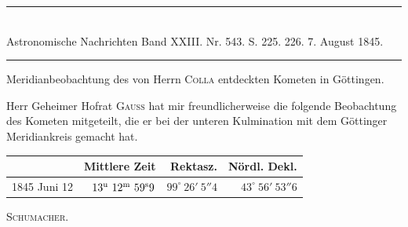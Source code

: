 \clearpage
{}
\hypertarget{native-476-middle}{}
\begin{center}
\rule{0.55\linewidth}{0.4pt}\\[2pt]
Astronomische Nachrichten Band XXIII. Nr. 543. S. 225. 226. 7. August 1845.\\[2pt]
\rule{0.55\linewidth}{0.4pt}
\end{center}

\begin{center}Meridianbeobachtung des von Herrn \textsc{Colla} entdeckten Kometen in Göttingen.\end{center}

Herr Geheimer Hofrat \textsc{Gauss} hat mir freundlicherweise die folgende Beobachtung des Kometen mitgeteilt, die er bei der unteren Kulmination mit dem Göttinger Meridiankreis gemacht hat.

\begin{center}
\setlength{\tabcolsep}{5pt}
\begin{tabular}{l|r|r|r}
 & Mittlere Zeit & Rektasz. & Nördl. Dekl. \\
\hline
1845 Juni 12 & $13^{\rm u}\ 12^{\rm m}\ 59^{\rm s}9$ & $99^\circ\ 26'\ 5''4$ & $43^\circ\ 56'\ 53''6$ \\
\end{tabular}
\end{center}
\begin{flushright}\textsc{Schumacher}.\end{flushright}

